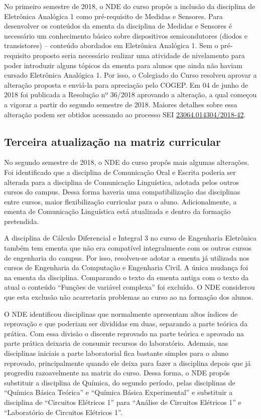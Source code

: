 No primeiro semestre de 2018, o NDE do curso propôs a inclusão da disciplina de Eletrônica Analógica 1 como pré-requisito de Medidas e Sensores. Para desenvolver os conteúdos da ementa da disciplina de Medidas e Sensores é necessário um conhecimento básico sobre dispositivos semicondutores (diodos e transistores) – conteúdo abordados em Eletrônica Analógica 1. Sem o pré-requisito proposto seria necessário realizar uma atividade de nivelamento para poder introduzir alguns tópicos da ementa para alunos que ainda não haviam cursado Eletrônica Analógica 1. Por isso, o Colegiado do Curso resolveu aprovar a alteração proposta e enviá-la para apreciação pelo COGEP. Em 04 de junho de 2018 foi publicada a Resolução nº 36/2018 aprovando a alteração, a qual começou a vigorar a partir do segundo semestre de 2018. Maiores detalhes sobre essa alteração podem ser obtidos acessando ao processo SEI \href{https://sei.utfpr.edu.br/sei/publicacoes/controlador_publicacoes.php?acao=publicacao_visualizar&id_documento=321940&id_orgao_publicacao=0}{23064.014304/2018-42}. 

\subsection{Terceira atualização na matriz curricular}

No segundo semestre de 2018, o NDE do curso propôs mais algumas alterações. Foi identificado que a disciplina de Comunicação Oral e Escrita poderia ser alterada para a disciplina de Comunicação Linguística, adotada pelos outros cursos do campus. Dessa forma haveria uma compatibilização das disciplinas entre cursos, maior flexibilização curricular para o aluno. Adicionalmente, a ementa de Comunicação Linguística está atualizada e dentro da formação pretendida. 

A disciplina de Cálculo Diferencial e Integral 3 no curso de Engenharia Eletrônica também tem ementa que não era compatível integralmente com os outros cursos de engenharia do campus. Por isso, resolveu-se adotar a ementa já utilizada nos cursos de Engenharia da Computação e Engenharia Civil. A única mudança foi na ementa da disciplina. Comparando o texto da ementa antiga com o texto da atual o conteúdo ``Funções de variável complexa'' foi excluído. O NDE considerou que esta exclusão não acarretaria problemas ao curso ao na formação dos alunos.

O NDE identificou disciplinas que normalmente apresentam altos índices de reprovação e que poderiam ser divididas em duas, separando a parte teórica da prática. Com essa divisão o discente reprovado na parte teórica e aprovado na parte prática deixaria de consumir recursos do laboratório. Ademais, nas disciplinas iniciais a parte laboratorial fica bastante simples para o aluno reprovado, principalmente quando ele deixa para fazer a disciplina depois que já progrediu razoavelmente na matriz do curso. Dessa forma, o NDE propôs substituir a disciplina de Química, do segundo período, pelas disciplinas de ``Química Básica Teórica'' e ``Química Básica Experimental'' e substituir a disciplina de ``Circuitos Elétricos 1'' para ``Análise de Circuitos Elétricos 1'' e ``Laboratório de Circuitos Elétricos 1''.

